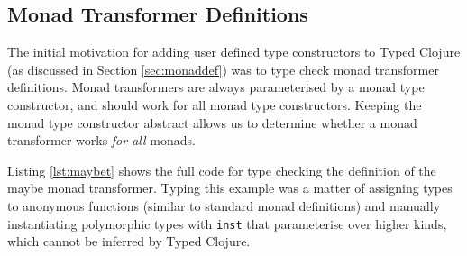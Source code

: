 \subsection{Monad Transformer Definitions}

The initial motivation for adding user defined type constructors to Typed Clojure
(as discussed in Section \ref{sec:monaddef}) was to type check
monad transformer definitions.
Monad transformers are always parameterised by a monad type constructor, and should work for all
monad type constructors. Keeping the monad type constructor abstract allows us to determine
whether a monad transformer works \emph{for all} monads.

Listing \ref{lst:maybet} shows the full code for type checking the definition
of the maybe monad transformer.
Typing this example was a matter of assigning types to anonymous functions
(similar to standard monad definitions) and manually instantiating 
polymorphic types with \lstinline|inst|
that parameterise over higher kinds, which cannot be inferred by Typed Clojure.

